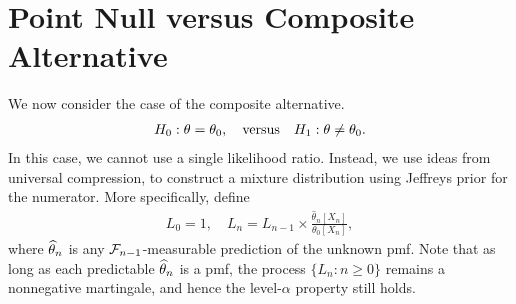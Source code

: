 \documentclass[12pt]{article}
\begin{document}
\section{Point Null versus Composite Alternative}
\label{sec:point-null-comp-alt}
We now consider the case of the composite alternative. 
\begin{align}
    H_0: \theta = \theta_0, \quad \text{versus} \quad H_1: \theta \neq \theta_0. 
\end{align}
In this case, we cannot use a single likelihood ratio. Instead, we use ideas from universal compression, to construct a mixture distribution using Jeffreys prior for the numerator. More specifically, define 
\begin{align}
    L_0 = 1, \quad L_n = L_{n-1} \times \frac{\hat{\theta}_n[X_n]}{\theta_0[X_n]}, 
\end{align}
where $\widehat{\theta}_n$ is any ${\cal F}_{n-1}$-measurable prediction of the unknown pmf. Note that as long as each predictable $\widehat{\theta}_n$ is a pmf, the process $\{L_n: n \geq 0\}$ remains a nonnegative martingale, and hence the level-$\alpha$ property still holds. 
\end{document}
